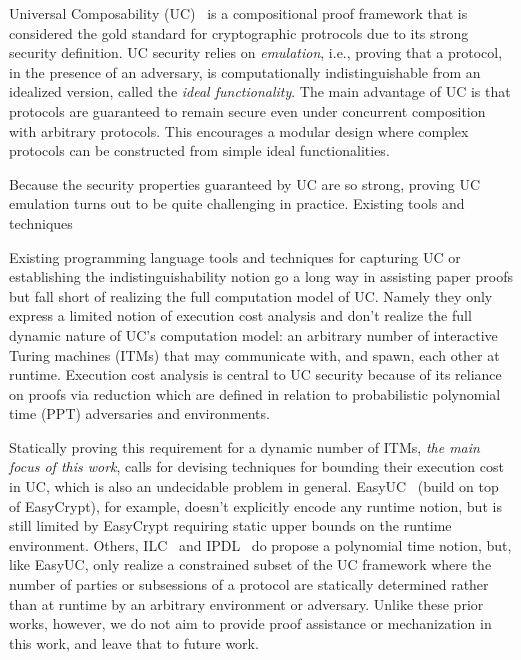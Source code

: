 
Universal Composability (UC)~\cite{canettiUC} is a compositional proof framework that is considered the gold
standard for cryptographic protrocols due to its strong security definition.
UC security relies on \emph{emulation}, i.e., proving that a protocol, in the presence of an adversary, is
computationally indistinguishable from an idealized version, called the \emph{ideal functionality}.
The main advantage of UC is that protocols are guaranteed to remain secure even under concurrent composition
with arbitrary protocols.
This encourages a modular design where complex protocols can be constructed from simple ideal functionalities.

Because the security properties guaranteed by UC are so strong, proving UC emulation turns out to be quite
challenging in practice. Existing tools and techniques 

Existing programming language tools and techniques for capturing UC or establishing the indistinguishability notion go a long way in assisting paper proofs but fall short of realizing the full computation model of UC.
Namely they only express a limited notion of execution cost analysis and don't realize the full dynamic nature of UC's computation model: an arbitrary number of interactive Turing machines (ITMs) that may communicate with, and spawn, each other at runtime.
Execution cost analysis is central to UC security because of its reliance on proofs via reduction which are defined in relation to probabilistic polynomial time (PPT) adversaries and environments.

Statically proving this requirement for a dynamic number of ITMs, \emph{the main focus of this work}, calls for devising techniques for bounding their execution cost in UC,
which is also an undecidable problem in general.
EasyUC~\cite{easyuc} (build on top of EasyCrypt), for example, doesn't explicitly encode any runtime notion, but is still limited by EasyCrypt requiring static upper bounds on the runtime environment.
Others, ILC~\cite{ilc} and IPDL~\cite{ipdl} do propose a polynomial time notion, but, like EasyUC, only realize a constrained subset of the UC framework where the number of parties or subsessions of a protocol are statically determined rather than at runtime by an arbitrary environment or adversary.
Unlike these prior works, however, we do not aim to provide proof assistance or mechanization in this work, and leave that to future work.

